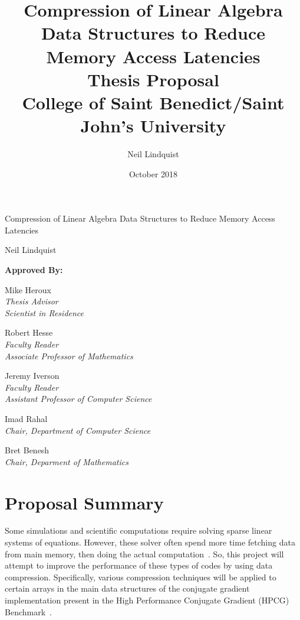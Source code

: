 \documentclass[titlepage]{article}
\begin{document}
\title{
	Compression of Linear Algebra Data Structures to Reduce Memory Access Latencies \\
	\bigskip
	\Large Thesis Proposal\\
	\bigskip
	College of Saint Benedict/Saint John's University}
\author{Neil Lindquist}
\date{October 2018}

\maketitle

\begin{center}
	{\Large Compression of Linear Algebra Data Structures to Reduce Memory Access Latencies}
	
	Neil Lindquist 
	
	\bigskip
	\bigskip
	
	\textbf{Approved By:}
	
	\bigskip
	
	Mike Heroux\\
	\textit{Thesis Advisor}\\
	\textit{Scientist in Residence}

	\bigskip

	Robert Hesse\\
	\textit{Faculty Reader}\\
	\textit{Associate Professor of Mathematics}

	\bigskip

	Jeremy Iverson\\
	\textit{Faculty Reader}\\
	\textit{Assistant Professor of Computer Science}
	
	\bigskip
	
	Imad Rahal\\
	\textit{Chair, Department of Computer Science}
	
	\bigskip
	
	Bret Benesh\\
	\textit{Chair, Deparment of Mathematics}
\end{center}

\clearpage


\section{Proposal Summary}
Some simulations and scientific computations require solving sparse linear systems of equations.
However, these solver often spend more time fetching data from main memory, then doing the actual computation~\cite{Goumas:2009:performanceEval}.
So, this project will attempt to improve the performance of these types of codes by using data compression.
Specifically, various compression techniques will be applied to certain arrays in the main data structures of the conjugate gradient implementation present in the High Performance Conjugate Gradient (HPCG) Benchmark~\cite{Dongarra:2015:HPCG}.
\end{document}
